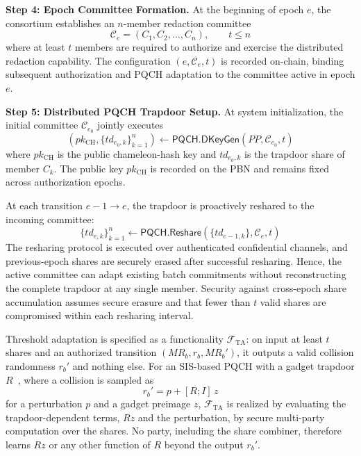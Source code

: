 \documentclass[lettersize,journal]{IEEEtran}
\begin{document}
\textbf{Step 4: Epoch Committee Formation.}
At the beginning of epoch $e$, the consortium establishes an
$n$-member redaction committee
\begin{equation}
\mathcal{C}_e=(C_1,C_2,\ldots,C_n),\qquad t\leq n
\end{equation}
where at least $t$ members are required to authorize and exercise the
distributed redaction capability. The configuration
$(e,\mathcal{C}_e,t)$ is recorded on-chain, binding subsequent
authorization and PQCH adaptation to the committee active in epoch $e$.

\textbf{Step 5: Distributed PQCH Trapdoor Setup.}
At system initialization, the initial committee
$\mathcal{C}_{e_0}$ jointly executes
\begin{equation}
(pk_{\mathrm{CH}},\{td_{e_0,k}\}_{k=1}^{n})
\leftarrow
\mathsf{PQCH.DKeyGen}(PP,\mathcal{C}_{e_0},t)
\end{equation}
where $pk_{\mathrm{CH}}$ is the public chameleon-hash key and
$td_{e_0,k}$ is the trapdoor share of member $C_k$.
The public key $pk_{\mathrm{CH}}$ is recorded on the PBN and remains
fixed across authorization epochs.

At each transition $e-1\rightarrow e$, the trapdoor is proactively
reshared to the incoming committee:
\begin{equation}
\{td_{e,k}\}_{k=1}^{n}
\leftarrow
\mathsf{PQCH.Reshare}
(\{td_{e-1,k}\},\mathcal{C}_e,t)
\end{equation}
The resharing protocol is executed over authenticated confidential
channels, and previous-epoch shares are securely erased after successful
resharing. Hence, the active committee can adapt existing batch
commitments without reconstructing the complete trapdoor at any single
member. Security against cross-epoch share accumulation assumes secure
erasure and that fewer than $t$ valid shares are compromised within
each resharing interval.

Threshold adaptation is specified as a functionality
$\mathcal{F}_{\mathrm{TA}}$: on input at least $t$ shares and an
authorized transition $(MR_b,r_b,MR_b')$, it outputs a valid collision
randomness $r_b'$ and nothing else. For an SIS-based PQCH with a gadget
trapdoor $R$~\cite{ref10,ref17}, where a collision is sampled as
\begin{equation}
r_b'=p+[R;I]\,z
\end{equation}
for a perturbation $p$ and a gadget preimage $z$,
$\mathcal{F}_{\mathrm{TA}}$ is realized by evaluating the
trapdoor-dependent terms, $Rz$ and the perturbation, by secure
multi-party computation over the shares. No party, including the share
combiner, therefore learns $Rz$ or any other function of $R$ beyond the
output $r_b'$.
\end{document}
